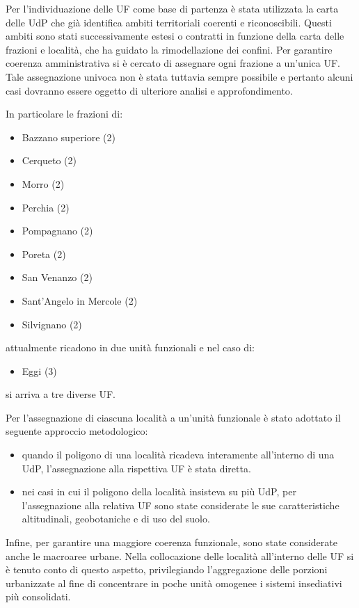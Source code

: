 \documentclass[
  a4paper,
]{book}
\providecommand{\tightlist}{%
  \setlength{\itemsep}{0pt}\setlength{\parskip}{0pt}}
\begin{document}
Per l'individuazione delle UF come base di partenza è stata utilizzata la carta delle UdP che già identifica ambiti territoriali coerenti e riconoscibili.
Questi ambiti sono stati successivamente estesi o contratti in funzione della carta delle frazioni e località, che ha guidato la rimodellazione dei confini.
Per garantire coerenza amministrativa si è cercato di assegnare ogni frazione a un'unica UF.
Tale assegnazione univoca non è stata tuttavia sempre possibile e pertanto alcuni casi dovranno essere oggetto di ulteriore analisi e approfondimento.

In particolare le frazioni di:

\begin{itemize}
\tightlist
\item
  Bazzano superiore (2)
\item
  Cerqueto (2)
\item
  Morro (2)
\item
  Perchia (2)
\item
  Pompagnano (2)
\item
  Poreta (2)
\item
  San Venanzo (2)
\item
  Sant'Angelo in Mercole (2)
\item
  Silvignano (2)
\end{itemize}

attualmente ricadono in due unità funzionali e nel caso di:

\begin{itemize}
\tightlist
\item
  Eggi (3)
\end{itemize}

si arriva a tre diverse UF.

Per l'assegnazione di ciascuna località a un'unità funzionale è stato adottato il seguente approccio metodologico:

\begin{itemize}
\tightlist
\item
  quando il poligono di una località ricadeva interamente all'interno di una UdP, l'assegnazione alla rispettiva UF è stata diretta.
\item
  nei casi in cui il poligono della località insisteva su più UdP, per l'assegnazione alla relativa UF sono state considerate le sue caratteristiche altitudinali, geobotaniche e di uso del suolo.
\end{itemize}

Infine, per garantire una maggiore coerenza funzionale, sono state considerate anche le macroaree urbane.
Nella collocazione delle località all'interno delle UF si è tenuto conto di questo aspetto, privilegiando l'aggregazione delle porzioni urbanizzate al fine di concentrare in poche unità omogenee i sistemi insediativi più consolidati.
\end{document}
